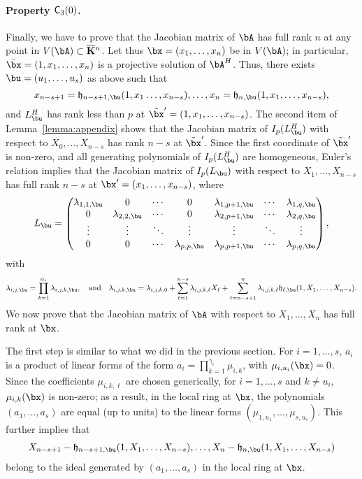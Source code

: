 \documentclass[12pt]{article}
\begin{document}
\paragraph{Property $\mathsf{C}_3(0)$.} Finally, we have to prove that the Jacobian
matrix of $\bA$ has full rank $n$ at any point in $V(\bA) \subset
\KKbar{}^n$. Let thus $\bx=(x_1,\dots,x_n)$ be in $V(\bA)$; in
particular, $\tilde \bx=(1,x_1,\dots,x_n)$ is a projective solution of
$\bA^H$.  Thus, there exists $\bu=(u_1,\dots,u_s)$ as above such that
$$x_{n-s+1}=\mathfrak{h}_{n-s+1,\bu}(1,x_1\dots,x_{n-s}),\dots,x_{n}=\mathfrak{h}_{n,\bu}(1,x_1,\dots,x_{n-s}),$$
and $\mL^H_\bu$ has rank less than $p$ at $\tilde\bx'=(1,x_1,\dots,x_{n-s})$.  The second item of
Lemma~\ref{lemma:appendix} shows that the Jacobian matrix of
$I_p(\mL^H_\bu)$ with respect to $X_0,\dots,X_{n-s}$ has rank $n-s$
at $\tilde \bx'$. Since the first coordinate of $\tilde\bx'$ is non-zero,
and all generating polynomials of $I_p(\mL^H_\bu)$ are homogeneous,
Euler's relation implies that the Jacobian matrix of $I_p(\mL_\bu)$
with respect to $X_1,\dots,X_{n-s}$
has full rank $n-s$ at $\bx'=(x_1,\dots,x_{n-s})$, where  
\begin{align}\label{eqdef:Lu}
 \mL_\bu = \left( \begin{matrix}
\lambda_{1,1,\bu} & 0 & \cdots & 0 & \lambda_{1,p+1,\bu} & \cdots & \lambda_{1, q,\bu}\\
0 & \lambda_{2,2,\bu} & \cdots & 0 & \lambda_{2,p+1,\bu} & \cdots & \lambda_{2, q,\bu}\\
\vdots & \vdots & \ddots & \vdots & \vdots & \ddots & \vdots\\
0 & 0 & \cdots & \lambda_{p,p,\bu} & \lambda_{p,p+1,\bu} & \cdots & \lambda_{p, q,\bu}
\end{matrix} \right),
\end{align}
with
$$\lambda_{i,j,\bu}=\prod_{k=1}^{\alpha_i}\lambda_{i,j,k,\bu},
\quad\text{and}\quad \lambda_{i,j,k,\bu}=\lambda_{i,j,k,0}+\sum_{\ell
  = 1}^{n-s}\lambda_{i,j,k,\ell}X_\ell + \sum_{\ell =
  n-s+1}^{n}\lambda_{i,j,k,\ell}
\mathfrak{h}_{\ell,\bu}(1,X_1,\dots,X_{n-s}).$$ We now  prove
that the Jacobian matrix of $\bA$ with respect to $X_1,\dots,X_n$ has
full rank at $\bx$.

The first step is similar to what we did in the previous section.  For
$i=1,\dots,s$, $a_i$ is a product of linear forms of the form
$a_i=\prod_{k=1}^{\gamma_i} \mu_{i,k}$, with $\mu_{i,u_i}(\bx)=0$.
Since the coefficients $\mu_{i,k,\ell}$ are chosen generically, for
$i=1,\dots,s$ and $k \ne u_i$, $\mu_{i,k}(\bx)$ is non-zero; as a
result, in the local ring at $\bx$, the polynomials $(a_1,\dots,a_s)$
are equal (up to units) to the linear forms
$(\mu_{1,u_1},\dots,\mu_{s,u_s})$. This further implies that
\begin{align}\label{eq:subst}
X_{n-s+1}-\mathfrak{h}_{n-s+1,\bu}(1,X_1,\dots,X_{n-s}),\dots,X_{n}-\mathfrak{h}_{n,\bu}(1,X_1,\dots,X_{n-s})
\end{align}
belong to the ideal generated by $(a_1,\dots,a_s)$ in the local 
ring at $\bx$.
\end{document}
